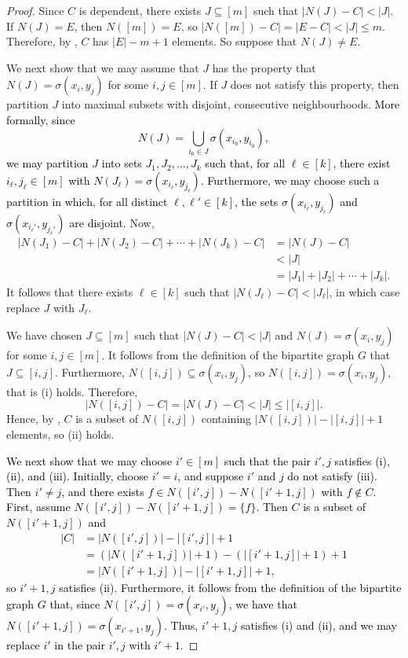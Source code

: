 \documentclass[11pt]{amsart}
\newcommand{\bloo}{\textcolor{black}}
\begin{document}
\begin{proof}
Since $C$ is dependent, there exists $J \subseteq [m]$ such that $|N(J)-C| < |J|$. If $N(J)=E$, then $N([m])=E$, so $|N([m])-C| = |E-C| < |J| \leq m$. Therefore, by , $C$ has $|E|-m+1$ elements. So suppose that $N(J) \neq E$.

We next show that we may assume that $J$ has the property that $\left.N(J)=\sigma(x_i,y_j)\right.$ for some $i,j \in [m]$. If $J$ does not satisfy this property, then partition $J$ into maximal subsets with disjoint, consecutive neighbourhoods. \bloo{More formally, since 
\[N(J) = \bigcup\limits_{i_0 \in J}\sigma(x_{i_0},y_{i_0}),\] 
we may partition $J$ into sets $J_1, J_2, \ldots, J_k$ such that, for all $\ell \in [k]$, there \bloo{exist} $i_\ell, j_\ell \in [m]$ with $N(J_\ell) = \sigma(x_{i_\ell}, y_{j_\ell})$. Furthermore, we may choose such a partition in which, for all distinct $\ell,\ell' \in [k]$, the sets $\sigma(x_{i_{\ell}},y_{j_\ell})$ and $\sigma(x_{i_\ell'},y_{j_\ell'})$ are disjoint.} Now,
\begin{align*}
|N(J_1)-C|+|N(J_2)-C|+\cdots+|N(J_k)-C| & = |N(J)-C| \\
&< |J| \\
&= |J_1| + |J_2| + \cdots + |J_k|.
\end{align*}
It follows that there exists $\ell \in [k]$ such that $|N(J_\ell)-C| < |J_\ell|$, in which case replace $J$ with $J_{\ell}$.

We have chosen $J \subseteq [m]$ such that $|N(J)-C| < |J|$ and $N(J) = \sigma(x_i,y_j)$ for some $i,j \in [m]$. It follows from the definition of the bipartite graph $G$ that $J \subseteq [i,j]$. Furthermore, $N([i,j]) \subseteq \sigma(x_i,y_j)$, so $N([i,j]) = \sigma(x_i,y_j)$, that is (i) holds. Therefore,
\[|N([i,j])-C|=|N(J)-C| < |J| \leq \left|[i,j]\right|.\]
Hence, by , $C$ is a subset of $N([i,j])$ containing $\left.|N([i, j])|-|[i, j]|+1\right.$ elements, so (ii) holds.

\bloo{We next show that we may choose $i' \in [m]$ such that the pair $i',j$ satisfies (i), (ii), and (iii). Initially, choose $i'=i$, and suppose $i'$ and $j$ do not satisfy (iii). Then $i' \neq j$, and there exists $f \in N([i', j]) - N([i'+1, j])$ with $f \notin C$. First, assume $\left.N([i',j])-N([i'+1,j]) = \{f\}\right.$. Then $C$ is a subset of $N([i'+1,j])$ and
\begin{align*}
|C| &= |N([i',j])| - |[i',j]| + 1 \\
&= (|N([i'+1,j])|+1) - (|[i'+1,j]|+1) + 1 \\ 
&= |N([i'+1,j])| - |[i'+1,j]| + 1,
\end{align*}
so $i'+1,j$ satisfies (ii). Furthermore, it follows from the definition of the bipartite graph $G$ that, since $N([i',j])=\sigma(x_{i'},y_j)$, we have that $\left.N([i'+1,j])=\sigma(x_{i'+1},y_j)\right.$. Thus, $i'+1,j$ satisfies (i) and (ii), and we may replace $i'$ in the pair $i',j$ with $i'+1$.}


\end{proof}
\end{document}
